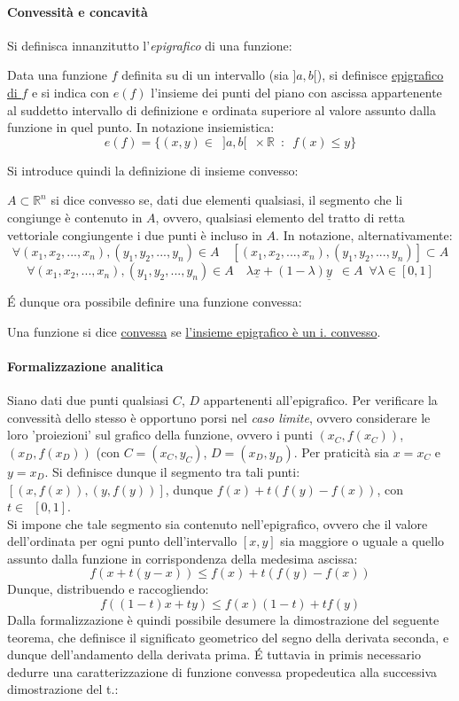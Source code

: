 \documentclass[10pt]{article}
\theoremstyle{plain}
\begin{document}
\paragraph{Convessità e concavità}
Si definisca innanzitutto l'\textit{epigrafico} di una funzione:
\begin{defin}
Data una funzione $f$ definita su di un intervallo (sia $]a, b[$), si definisce \underline{epigrafico di $f$} e si indica con $e(f)$ l'insieme dei punti del piano con ascissa appartenente al suddetto intervallo di definizione e ordinata superiore al valore assunto dalla funzione in quel punto. In notazione insiemistica:
\[e(f) = \{(x,y) \in \enspace ]a, b[ \enspace \times \mathbb{R} \enspace : \enspace f(x) \leq y\}\]
\end{defin}
Si introduce quindi la definizione di insieme convesso:
\begin{defin}
$A \subset \mathbb{R}^n$ si dice convesso se, dati due elementi qualsiasi, il segmento che li congiunge è contenuto in $A$, ovvero, qualsiasi elemento del tratto di retta vettoriale congiungente i due punti è incluso in $A$. In notazione, alternativamente:
\[\forall (x_1, x_2, ..., x_n), (y_1, y_2, ..., y_n) \in A \quad [(x_1, x_2, ..., x_n), (y_1, y_2, ..., y_n)] \subset A\]
\[\forall (x_1, x_2, ..., x_n), (y_1, y_2, ..., y_n) \in A \quad \lambda \underline{x} + (1-\lambda) \underline{y} \enspace \in A \enspace \forall \lambda \in [0,1]\]
\end{defin}
\'E dunque ora possibile definire una funzione convessa:
\begin{defin}
Una funzione si dice \underline{convessa} se \underline{l'insieme epigrafico è un i. convesso}.
\end{defin}
\paragraph{Formalizzazione analitica}
Siano dati due punti qualsiasi $C$, $D$ appartenenti all'epigrafico. Per verificare la convessità dello stesso è opportuno porsi nel \textit{caso limite}, ovvero considerare le loro 'proiezioni' sul grafico della funzione, ovvero i punti $(x_C, f(x_C))$, $(x_D, f(x_D))$ (con $C = (x_C, y_C)$, $D = (x_D, y_D)$. Per praticità sia $x = x_C$ e $y = x_D$. Si definisce dunque il segmento tra tali punti: $[(x, f(x)), (y, f(y))]$, dunque $f(x) + t (f(y) - f(x))$, con $t \in \enspace [0, 1]$.\\
Si impone che tale segmento sia contenuto nell'epigrafico, ovvero che il valore dell'ordinata per ogni punto dell'intervallo $[x, y]$ sia maggiore o uguale a quello assunto dalla funzione in corrispondenza della medesima ascissa:
\[f(x + t (y - x)) \leq f(x) + t (f(y) - f(x))\]
Dunque, distribuendo e raccogliendo:
\[f((1-t) x + t y) \leq f(x) (1-t) + t f(y)\]
Dalla formalizzazione è quindi possibile desumere la dimostrazione del seguente teorema, che definisce il significato geometrico del segno della derivata seconda, e dunque dell'andamento della derivata prima. \'E tuttavia in primis necessario dedurre una caratterizzazione di funzione convessa propedeutica alla successiva dimostrazione del t.:
\end{document}
